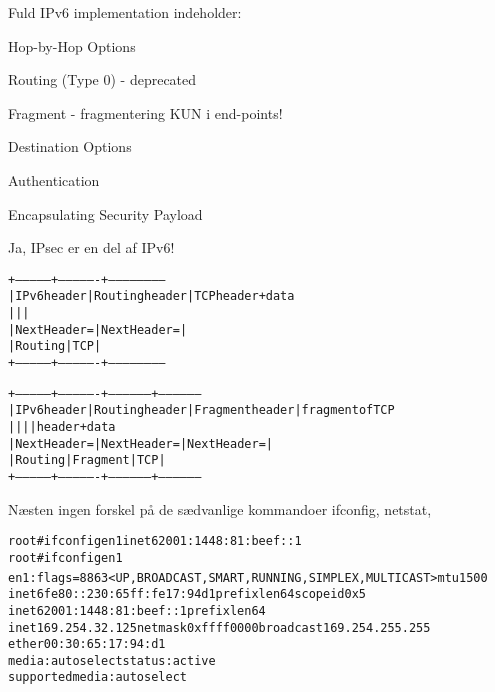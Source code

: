 \documentclass[Screen16to9,17pt]{foils}
\begin{document}

\begin{list1}
\item Fuld IPv6 implementation indeholder:
\begin{list2}
\item Hop-by-Hop Options
\item Routing (Type 0) - deprecated
\item Fragment - fragmentering KUN i end-points!
\item Destination Options
\item Authentication
\item Encapsulating Security Payload
\end{list2}
\item Ja, IPsec er en del af IPv6!
\end{list1}


\begin{alltt}
\small
  +---------------+----------------+------------------------
  |  IPv6 header  | Routing header | TCP header + data
  |               |                |
  | Next Header = |  Next Header = |
  |    Routing    |      TCP       |
  +---------------+----------------+------------------------

  +---------------+----------------+-----------------+-----------------
  |  IPv6 header  | Routing header | Fragment header | fragment of TCP
  |               |                |                 |  header + data
  | Next Header = |  Next Header = |  Next Header =  |
  |    Routing    |    Fragment    |       TCP       |
  +---------------+----------------+-----------------+-----------------
\end{alltt}


Næsten ingen forskel på de sædvanlige kommandoer ifconfig, netstat,
\begin{alltt}
\small
root# ifconfig en1 inet6 2001:1448:81:beef::1
root# ifconfig en1
en1: flags=8863<UP,BROADCAST,SMART,RUNNING,SIMPLEX,MULTICAST> mtu 1500{\color{security6blue}
        inet6 fe80::230:65ff:fe17:94d1 prefixlen 64 scopeid 0x5
        inet6 2001:1448:81:beef::1 prefixlen 64 }
        inet 169.254.32.125 netmask 0xffff0000 broadcast 169.254.255.255
        ether 00:30:65:17:94:d1
        media: autoselect status: active
        supported media: autoselect
\end{alltt}
\end{document}
